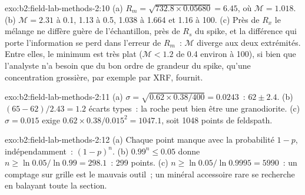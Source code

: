 \begin{solution}{exo:b2:field-lab-methods-2:10}
(a) $R_m = \sqrt{732.8 \times 0.05680} = 6.45$, où $\mathcal M = 1.018$. (b) $\mathcal M = 2.31$
à 0.1, 1.13 à 0.5, 1.038 à 1.664 et 1.16 à 100. (c) Près de $R_x$ le mélange ne diffère guère de
l'échantillon, près de $R_s$ du spike, et la différence qui porte l'information se perd dans
l'erreur de $R_m$~: $\mathcal M$ diverge aux deux extrémités. Entre elles, le minimum est très plat
($\mathcal M < 1.2$ de 0.4 environ à 100), si bien que l'analyste n'a besoin que du bon ordre de grandeur
du spike, qu'une concentration grossière, par exemple par XRF, fournit.
\end{solution}

\begin{solution}{exo:b2:field-lab-methods-2:11}
(a) $\sigma = \sqrt{0.62 \times 0.38/400} = 0.0243$~: $62 \pm 2.4$. (b) $(65 - 62)/2.43 = 1.2$
écarts types~: la roche peut bien être une granodiorite. (c) $\sigma = 0.015$ exige $0.62 \times
0.38/0.015^2 = 1047.1$, soit 1048 points de feldspath.
\end{solution}

\begin{solution}{exo:b2:field-lab-methods-2:12}
(a) Chaque point manque avec la probabilité $1 - p$, indépendamment~: $(1-p)^n$. (b) $0.99^n \le 0.05$
donne $n \ge \ln 0.05/\ln 0.99 = 298.1$~: 299 points. (c) $n \ge \ln 0.05/\ln 0.9995 = 5990$~: un comptage
sur grille est le mauvais outil~; un minéral accessoire rare se recherche en balayant toute la section.
\end{solution}

